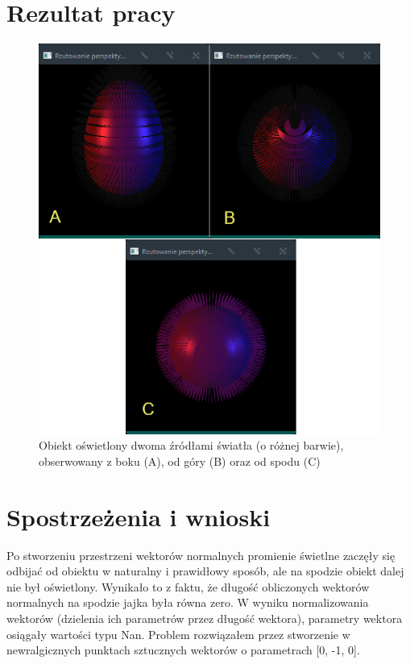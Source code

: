 \documentclass[a4paper,11pt]{article}
\begin{document}
\section{Rezultat pracy}

\begin{figure}[h!]
    \centering
    \includegraphics[width=1.0\linewidth]{screen.png}
    \caption{Obiekt oświetlony dwoma źródłami światła (o różnej barwie), obserwowany z boku (A), od góry (B) oraz od spodu (C)}
    \label{fig:screen1}
\end{figure}

\newpage

\section{Spostrzeżenia i wnioski}
Po stworzeniu przestrzeni wektorów normalnych promienie świetlne zaczęły się odbijać od obiektu w naturalny i prawidłowy sposób, ale na spodzie obiekt dalej nie był oświetlony. Wynikało to z faktu, że długość obliczonych wektorów normalnych na spodzie jajka była równa zero. W wyniku normalizowania wektorów (dzielenia ich parametrów przez długość wektora), parametry wektora osiągały wartości typu Nan. Problem rozwiązałem przez stworzenie w newralgicznych punktach sztucznych wektorów o parametrach [0, -1, 0].
\end{document}
